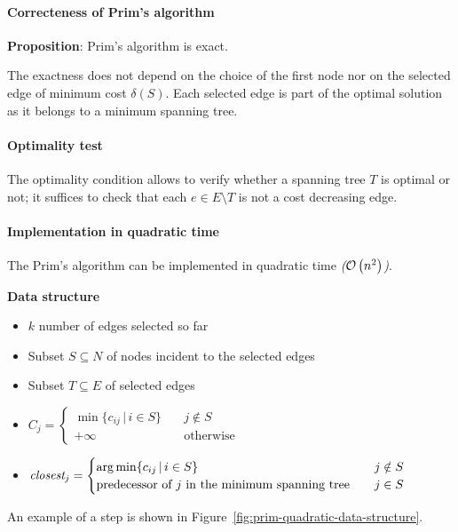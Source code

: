 \documentclass[english]{article}
\begin{document}
\paragraph{Correcteness of Prim's algorithm}

\textbf{Proposition}: Prim's algorithm is exact.

The exactness does not depend on the choice of the first node nor on the selected edge of minimum cost \(\delta(S)\).
Each selected edge is part of the optimal solution as it belongs to a minimum spanning tree.

\paragraph{Optimality test}

The optimality condition allows to verify whether a spanning tree \(T\) is optimal or not;
it suffices to check that each \(e \in E \setminus T\) is not a cost decreasing edge.

\paragraph{Implementation in quadratic time}

The Prim's algorithm can be implemented in quadratic time \textit{(\(\mathcal{O}\left(n^2\right)\))}.

\bigskip
\textbf{Data structure}

\begin{itemize}
  \item \(k\) number of edges selected so far
  \item Subset \(S \subseteq N\) of nodes incident to the selected edges
  \item Subset \(T \subseteq E\) of selected edges
  \item \(C_j = \begin{cases} \min \{c_{ij} \, | \, i \in S\} \quad &j \notin S \\ +\infty &\text{otherwise}\end{cases}\)
  \item \(\textit{closest}_j = \begin{cases} \operatorname*{arg\,min}\{c_{ij} \, | \, i \in S\}  & j \notin S \\ \text{predecessor of } j \text{ in the minimum spanning tree} \quad& j \in S \end{cases}\)
\end{itemize}

\bigskip
An example of a step is shown in Figure~\ref{fig:prim-quadratic-data-structure}.
\end{document}
